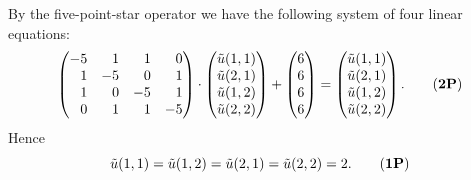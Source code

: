 \begin{loesung}
\begin{teilaufgaben}
\item
By the five-point-star operator we have the following system of
four linear equations:
\begin{equation}
\begin{pmatrix*}[r]
-5 &  1 &  1 &  0 \\
 1 & -5 &  0 &  1 \\
 1 &  0 & -5 &  1 \\
 0 &  1 &  1 & -5
\end{pmatrix*}
\cdot
\begin{pmatrix}
\tilde u(1,1) \\
\tilde u(2,1) \\
\tilde u(1,2) \\
\tilde u(2,2)
\end{pmatrix}
+
\begin{pmatrix*}[r] 6 \\  6 \\ 6 \\ 6 \end{pmatrix*}
=
\begin{pmatrix}
\tilde u(1,1) \\
\tilde u(2,1) \\
\tilde u(1,2) \\
\tilde u(2,2)
\end{pmatrix}.
\tag{\textbf{2P}}
\end{equation}
Hence
\begin{equation}
\tilde u(1,1)
=
\tilde u(1,2)
=
\tilde u(2,1)
=
\tilde u(2,2)
=
2.
\tag{\textbf{1P}}
\end{equation}
\end{teilaufgaben}
\end{loesung}
